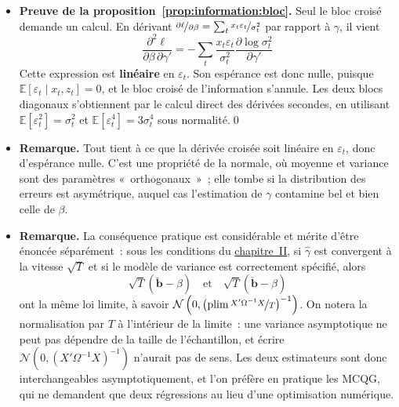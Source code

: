 \documentclass[10pt,a4paper]{article}
\newcommand{\siteurl}{https://le-mans.adjemian.eu/econometrics}
\newcommand{\chapref}[2]{\href{\siteurl/chapitre-#1.pdf}{chapitre~#2}}
\newcommand{\normal}[2]{\mathcal N\left(#1,#2\right)}
\theoremstyle{definition}
\renewcommand{\newline}{\unskip\par\vspace{1.5pt}}
\begin{document}
\begin{notes}

  \begin{itemize}

  \item \textbf{Preuve de la proposition~\ref{prop:information:bloc}.} Seul le
    bloc croisé demande un calcul. En dérivant
    $\nicefrac{\partial\ell}{\partial\beta} =
    \sum_t\nicefrac{x_t\varepsilon_t}{\sigma_t^2}$ par rapport à $\gamma$, il
    vient
    \[
      \frac{\partial^2\ell}{\partial\beta\,\partial\gamma'} =
      -\sum_t \frac{x_t\varepsilon_t}{\sigma_t^2}
      \frac{\partial \log\sigma_t^2}{\partial\gamma'}
    \]
    Cette expression est \textbf{linéaire} en $\varepsilon_t$. Son espérance est
    donc nulle, puisque $\mathbb E[\varepsilon_t\mid x_t,z_t]=0$, et le bloc
    croisé de l'information s'annule. Les deux blocs diagonaux s'obtiennent par
    le calcul direct des dérivées secondes, en utilisant
    $\mathbb E[\varepsilon_t^2]=\sigma_t^2$ et
    $\mathbb E[\varepsilon_t^4]=3\sigma_t^4$ sous normalité.\qed\newline

  \item \textbf{Remarque.} Tout tient à ce que la dérivée croisée soit linéaire
    en $\varepsilon_t$, donc d'espérance nulle. C'est une propriété de la
    normale, où moyenne et variance sont des paramètres «~orthogonaux~»~; elle
    tombe si la distribution des erreurs est asymétrique, auquel cas
    l'estimation de $\gamma$ contamine bel et bien celle de $\beta$.\newline

  \item \textbf{Remarque.} La conséquence pratique est considérable et mérite
    d'être énoncée séparément~: sous les conditions du \chapref{2}{II}, si
    $\hat\gamma$ est convergent à la vitesse $\sqrt T$ et si le modèle de
    variance est correctement spécifié, alors
    \[
      \sqrt T\left(\breve{\mathbf b} - \beta\right)
      \quad\text{et}\quad
      \sqrt T\left(\check{\mathbf b} - \beta\right)
    \]
    ont la même loi limite, à savoir
    $\normal{0}{\left(\text{plim}\,\nicefrac{X'\Omega^{-1}X}{T}\right)^{-1}}$.
    On notera la normalisation par $T$ à l'intérieur de la limite~: une
    variance asymptotique ne peut pas dépendre de la taille de l'échantillon, et
    écrire $\normal{0}{(X'\Omega^{-1}X)^{-1}}$ n'aurait pas de sens. Les deux
    estimateurs sont donc interchangeables asymptotiquement, et l'on préfère en
    pratique les MCQG, qui ne demandent que deux régressions au lieu d'une
    optimisation numérique.

  \end{itemize}

\end{notes}
\end{document}
